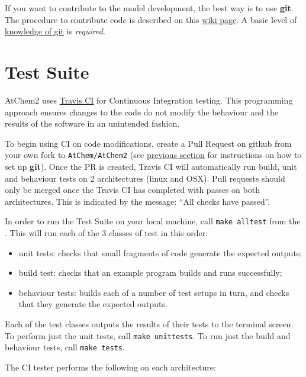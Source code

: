 If you want to contribute to the model development, the best way is to
use \textbf{git}. The procedure to contribute code is described
on this \href{https://github.com/AtChem/AtChem2/wiki/How-to-contribute}{wiki page}.
A basic level of \href{https://swcarpentry.github.io/git-novice/}{knowledge of git}
is \emph{required}.

\section{Test Suite} \label{sec:test-suite}

AtChem2 uses \href{https://travis-ci.org/}{Travis CI} for Continuous
Integration testing. This programming approach ensures changes to the
code do not modify the behaviour and the results of the software in an
unintended fashion.

To begin using CI on code modifications, create a Pull Request on
github from your own fork to \texttt{AtChem/AtChem2} (see
\hyperref[sec:general-information]{previous section} for instructions on how
to set up \textbf{git}). Once the PR is created, Travis CI will
automatically run build, unit and behaviour tests on 2 architectures
(linux and OSX). Pull requests should only be merged once the Travis
CI has completed with passes on both architectures. This is indicated
by the message: ``All checks have passed''.

In order to run the Test Suite on your local machine, call
\texttt{make\ alltest} from the \maindir. This will run
each of the 3 classes of test in this order:

\begin{itemize}
\item unit tests: checks that small fragments of code generate the
  expected outputs;
\item build test: checks that an example program builds and runs
  successfully;
\item behaviour tests: builds each of a number of test setups in turn,
  and checks that they generate the expected outputs.
\end{itemize}

Each of the test classes outputs the results of their tests to the
terminal screen. To perform just the unit tests, call \texttt{make\
  unittests}. To run just the build and behaviour tests, call
\texttt{make\ tests}.

The CI tester performs the following on each architecture:

